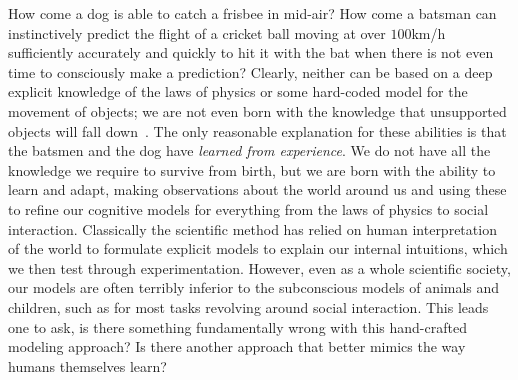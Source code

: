 
How come a dog is able to catch a
frisbee in mid-air? How come a batsman can instinctively predict the flight of a cricket ball
moving at over $100$km/h sufficiently accurately and quickly to hit it with the bat when there
is not even time to consciously make a prediction?  Clearly, neither can be based on a
deep explicit knowledge of the laws of physics or some hard-coded model for the movement
of objects; we are not even born with the knowledge that unsupported objects will 
fall down~\citep{baillargeon2002acquisition}.  The only reasonable explanation for these
abilities is that the batsmen and the dog have \emph{learned from experience}.  We do not have
all the knowledge we require to survive from birth, but we are born with the
ability to learn and adapt, making observations about the world around us and using these
to refine our cognitive models for everything from the laws of physics to social interaction.
Classically the scientific method has relied on human interpretation of the world to formulate
explicit models to explain our internal intuitions, which we then test
through experimentation.  However, even as a whole scientific society, our models
are often terribly inferior to the subconscious models of animals and children, such as for most
tasks revolving around social interaction.  This leads one to ask, is there something fundamentally
wrong with this hand-crafted modeling approach?  Is there another approach that better mimics the
way humans themselves learn?

